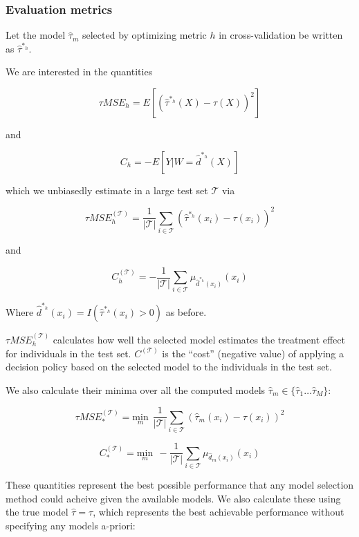 \subsubsection{Evaluation metrics}

Let the model $\hat\tau_m$ selected by optimizing metric $h$ in cross-validation be written as $\hat\tau^{*_h}$. 

We are interested in the quantities

\[
\tau MSE_h = E[ (\hat\tau^{*_h} (X) - \tau(X))^2 ]
\]

and 

\[
C_h = -E[ Y| W =\hat d^{*_h} (X)]
\]

which we unbiasedly estimate in a large test set $\mathcal{T}$ via

\begin{equation}
\label{true-mse}
\tau MSE^{(\mathcal{T})}_h = \frac{1}{|\mathcal{T}|}\sum_{i \in \mathcal{T}} (\hat\tau^{*_h} (x_i) - \tau(x_i))^2
\end{equation}

and 

\begin{equation}
\label{true-value}
C^{(\mathcal{T})}_h = -\frac{1}{|\mathcal{T}|}\sum_{i \in \mathcal{T}} \mu_{\hat d^{*_h}(x_i)}(x_i)
\end{equation}

Where $\hat d^{*_h}(x_i) = I(\hat\tau^{*_h}(x_i) > 0)$ as before. 

$\tau MSE_{h}^{(\mathcal{T})}$ calculates how well the selected model estimates the treatment effect for individuals in the test set. $C^{(\mathcal{T})}$ is the ``cost'' (negative value) of applying a decision policy based on the selected model to the individuals in the test set. 

We also calculate their minima over all the computed models $\hat\tau_m \in \{\hat\tau_1 \dots \hat\tau_M\}$:

\[
\tau MSE^{(\mathcal{T})}_{*} = \underset{m}{\text{min}} \ \ \frac{1}{|\mathcal{T}|}\sum_{i \in \mathcal{T}} (\hat\tau_m (x_i) - \tau(x_i))^2
\]

\[
C^{(\mathcal{T})}_{*} = \underset{m}{\text{min}} \ \ -\frac{1}{|\mathcal{T}|}\sum_{i \in \mathcal{T}} \mu_{\hat d_m(x_i)}(x_i)
\]

These quantities represent the best possible performance that any model selection method could acheive given the available models. We also calculate these using the true model $\hat\tau = \tau$, which represents the best achievable performance without specifying any models a-priori:

